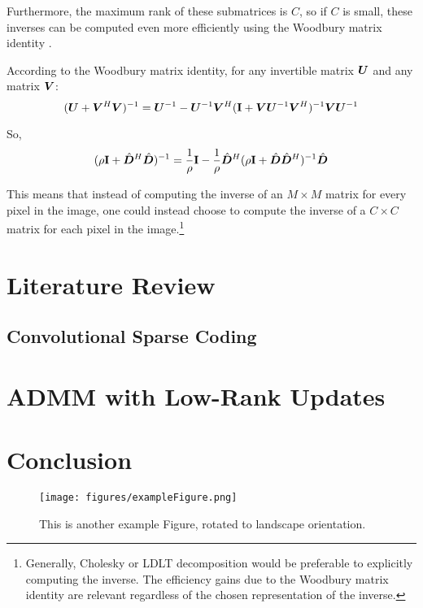 Furthermore, the maximum rank of these submatrices is $C$, so if $C$ is small, these inverses can be computed even more efficiently using the Woodbury matrix identity \cite{vsorel2016fast} \cite{heide2015fast} \cite{wohlberg2015efficient}.

According to the Woodbury matrix identity, for any invertible matrix $\bm{U}$ and any matrix $\bm{V}$:
\begin{equation}
(\bm{U} + \bm{V}^H\bm{V})^{-1} = \bm{U}^{-1} - \bm{U}^{-1}\bm{V}^H({\bf I} + \bm{V}\bm{U}^{-1}\bm{V}^H)^{-1}\bm{V}\bm{U}^{-1}
\end{equation}

So,
\begin{equation}
(\rho{\bf I} + \hat{\bm{D}}^H\hat{\bm{D}})^{-1} = \frac{1}{\rho}{\bf I} - \frac{1}{\rho}\hat{\bm{D}}^H(\rho{\bf I} + \hat{\bm{D}}\hat{\bm{D}}^H)^{-1}\hat{\bm{D}}
\end{equation}

This means that instead of computing the inverse of an $M \times M$ matrix for every pixel in the image, one could instead choose to compute the inverse of a $C \times C$ matrix for each pixel in the image.\footnote{Generally, Cholesky or LDLT decomposition would be preferable to explicitly computing the inverse. The efficiency gains due to the Woodbury matrix identity are relevant regardless of the chosen representation of the inverse.}

\section{Literature Review}
\subsection{Convolutional Sparse Coding}
\section{ADMM with Low-Rank Updates}
\section{Conclusion}

\begin{sidewaysfigure}
\texttt{[image: figures/exampleFigure.png]}
\caption{This is another example Figure, rotated to landscape orientation.}
\label{LandscapeFigure}
\end{sidewaysfigure}
